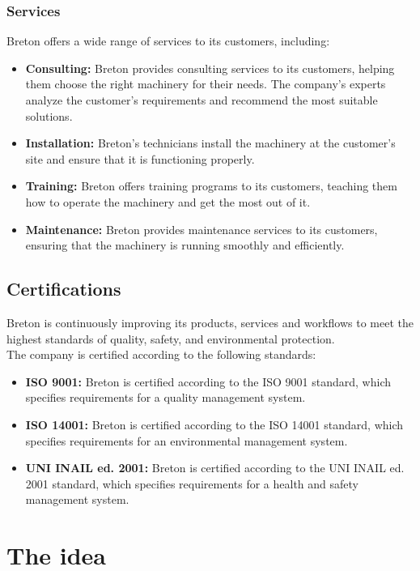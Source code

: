 \subsubsection{Services}
Breton offers a wide range of services to its customers, including:
\begin{itemize}
    \item \textbf{Consulting:} Breton provides consulting services to its customers, helping them choose the right machinery for their needs. The company's experts analyze the customer's requirements and recommend the most suitable solutions.
    \item \textbf{Installation:} Breton's technicians install the machinery at the customer's site and ensure that it is functioning properly.
    \item \textbf{Training:} Breton offers training programs to its customers, teaching them how to operate the machinery and get the most out of it.
    \item \textbf{Maintenance:} Breton provides maintenance services to its customers, ensuring that the machinery is running smoothly and efficiently.
\end{itemize}
\subsection{Certifications}
Breton is continuously improving its products, services and workflows to meet the highest standards of quality, safety, and environmental protection. \\
The company is certified according to the following standards:
\begin{itemize}
    \item \textbf{ISO 9001:} Breton is certified according to the ISO 9001 standard, which specifies requirements for a quality management system.
    \item \textbf{ISO 14001:} Breton is certified according to the ISO 14001 standard, which specifies requirements for an environmental management system.
    \item \textbf{UNI INAIL ed. 2001:} Breton is certified according to the UNI INAIL ed. 2001 standard, which specifies requirements for a health and safety management system.
\end{itemize}
\section{The idea}

